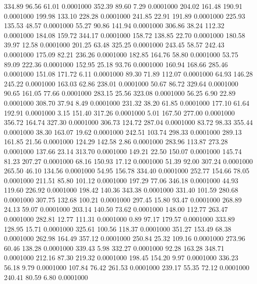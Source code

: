  334.89   96.56   61.01   0.0001000
 352.39   89.60    7.29   0.0001000
 204.02  161.48  190.91   0.0001000
 199.98  133.10  228.28   0.0001000
 241.85   22.91  191.89   0.0001000
 225.93  135.53   48.57   0.0001000
  55.27   90.86  141.94   0.0001000
 306.86   38.24  112.32   0.0001000
 184.08  159.72  344.17   0.0001000
 158.72  138.85   22.70   0.0001000
 180.58   39.97   12.58   0.0001000
 201.25   63.48  325.25   0.0001000
 243.45   58.57  242.43   0.0001000
 175.09   82.21  236.26   0.0001000
 182.85  164.76   58.80   0.0001000
  53.75   89.09  222.36   0.0001000
 152.95   25.18   93.76   0.0001000
 160.94  168.66  285.46   0.0001000
 151.08  171.72    6.11   0.0001000
  89.30   71.89  112.07   0.0001000
  64.93  146.28  245.22   0.0001000
 163.03   62.86  238.01   0.0001000
  50.67   86.72  329.64   0.0001000
  90.65  161.05   77.66   0.0001000
 283.15   25.56  323.08   0.0001000
  56.25    6.90   22.89   0.0001000
 308.70   37.94    8.49   0.0001000
 231.32   38.20   61.85   0.0001000
 177.10   61.64  192.91   0.0001000
   3.15  151.40  317.26   0.0001000
   5.01  167.50  277.00   0.0001000
 356.72  164.74  327.30   0.0001000
 306.73  124.72  287.04   0.0001000
  83.72   98.33  355.44   0.0001000
  38.30  163.07   19.62   0.0001000
 242.51  103.74  298.33   0.0001000
 289.13  161.85   21.56   0.0001000
 124.29  142.58    2.86   0.0001000
 283.96  113.87  273.28   0.0001000
 137.66   23.14  313.70   0.0001000
 149.21   22.50  150.07   0.0001000
 145.74   81.23  207.27   0.0001000
  68.16  150.93   17.12   0.0001000
  51.39   92.00  307.24   0.0001000
 265.50   46.10  134.56   0.0001000
  54.95  156.78  334.40   0.0001000
 252.77  154.66   78.05   0.0001000
 211.51   85.80  101.12   0.0001000
 197.29   77.06  346.18   0.0001000
  44.93  119.60  226.92   0.0001000
 198.42  140.36  343.38   0.0001000
 331.40  101.59  280.68   0.0001000
 307.75  132.68  100.21   0.0001000
 297.45   15.80   93.47   0.0001000
 268.89   24.13   59.07   0.0001000
 203.14  140.50   73.62   0.0001000
 148.00  112.77  263.47   0.0001000
 282.81   12.77  111.31   0.0001000
   0.89   97.17  179.57   0.0001000
 333.89  128.95   15.71   0.0001000
 325.61  100.56  118.37   0.0001000
 351.27  153.49   68.38   0.0001000
 262.98  164.49  357.12   0.0001000
 250.84   25.32  109.16   0.0001000
 273.96   60.46  138.28   0.0001000
 339.43    5.98  332.27   0.0001000
  92.28  163.28  348.71   0.0001000
 212.16   87.30  219.32   0.0001000
 198.45  154.20    9.97   0.0001000
 336.23   56.18    9.79   0.0001000
 107.84   76.42  261.53   0.0001000
 239.17   55.35   72.12   0.0001000
 240.41   80.59    6.80   0.0001000
